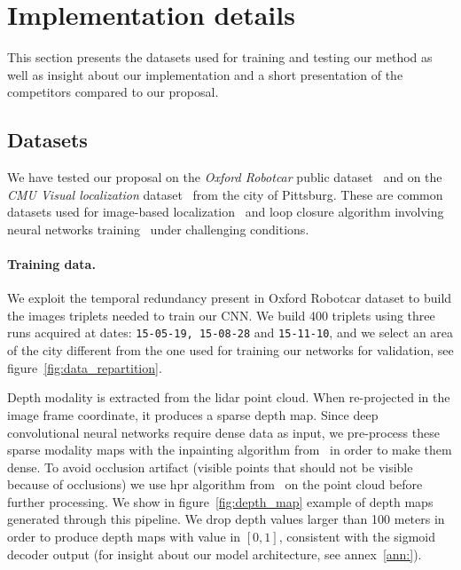 \section{Implementation details}
\label{sec:impl_details}

This section presents the datasets used for training and testing our method as well as insight about our implementation and a short presentation of the competitors compared to our proposal.

\subsection{Datasets}
\label{subsec:dataset}
	We have tested our proposal on the \textit{Oxford Robotcar} public dataset~\citep{Maddern2016} and on the \textit{CMU Visual localization} dataset~\citep{Bansal2014a} from the city of Pittsburg. These are common datasets used for image-based localization~\citep{Sattler2018} and loop closure algorithm involving neural networks training~\citep{Porav2018} under challenging conditions.
		
\paragraph{Training data.}
\label{para:training_data}

We exploit the temporal redundancy present in Oxford Robotcar dataset to build the images triplets needed to train our CNN. We build 400 triplets using three runs acquired at dates: \texttt{15-05-19, 15-08-28} and \texttt{15-11-10}, and we select an area of the city different from the one used for training our networks for validation, see figure~\ref{fig:data_repartition}.


Depth modality is extracted from the lidar point cloud. When re-projected in the image frame coordinate, it produces a sparse depth map. Since deep convolutional neural networks require dense data as input, we pre-process these sparse modality maps with the inpainting algorithm from~\citep{Bevilacqua2017} in order to make them dense. To avoid occlusion artifact (visible points that should not be visible because of occlusions) we use \ac{hpr} algorithm from~\citet{Katz2007} on the point cloud before further processing. We show in figure~\ref{fig:depth_map} example of depth maps generated through this pipeline. We drop depth values larger than 100 meters in order to produce depth maps with value in $[0, 1]$, consistent with the sigmoid decoder output (for insight about our model architecture, see annex~\ref{ann:}).

